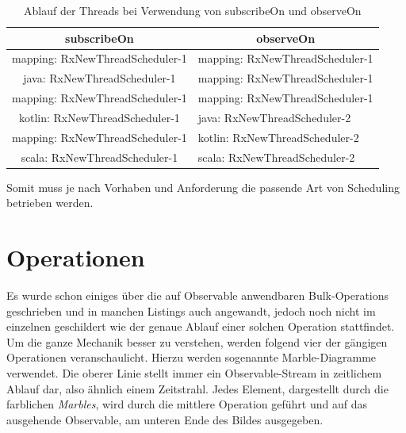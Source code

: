 \begin{table}[]
	\centering
	\begin{tabular}{|c|l|}
		\hline
		\rowcolor[HTML]{C0C0C0} 
		subscribeOn                                           & \multicolumn{1}{c|}{\cellcolor[HTML]{C0C0C0}observeOn} \\ \hline
		mapping: RxNewThreadScheduler-1                       & mapping: RxNewThreadScheduler-1 \\ \hline
		java: RxNewThreadScheduler-1						  & mapping: RxNewThreadScheduler-1 \\ \hline
		mapping: RxNewThreadScheduler-1 					  & mapping: RxNewThreadScheduler-1 \\ \hline
		kotlin: RxNewThreadScheduler-1  					  & java: RxNewThreadScheduler-2    \\ \hline
		mapping: RxNewThreadScheduler-1                       & kotlin: RxNewThreadScheduler-2  \\ \hline
		scala: RxNewThreadScheduler-1                         & scala: RxNewThreadScheduler-2   \\ \hline
	\end{tabular}
	\caption{Ablauf der Threads bei Verwendung von subscribeOn und observeOn}
\label{schedulertable}
\end{table}
Somit muss je nach Vorhaben und Anforderung die passende Art von Scheduling betrieben werden. 


\section{Operationen}
Es wurde schon einiges über die auf Observable anwendbaren Bulk-Operations geschrieben und in manchen Listings auch angewandt, jedoch noch nicht im einzelnen geschildert wie der genaue Ablauf einer solchen Operation stattfindet. Um die ganze Mechanik besser zu verstehen, werden folgend vier der gängigen Operationen veranschaulicht. Hierzu werden sogenannte Marble-Diagramme verwendet. Die oberer Linie stellt immer ein Observable-Stream in zeitlichem Ablauf dar, also ähnlich einem Zeitstrahl. Jedes Element, dargestellt durch die farblichen \textit{Marbles}, wird durch die mittlere Operation geführt und auf das ausgehende Observable, am unteren Ende des Bildes ausgegeben.
